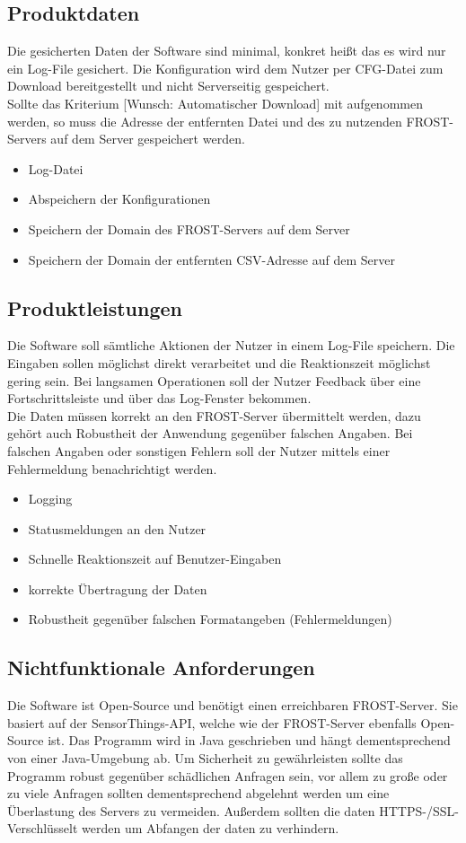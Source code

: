 \documentclass[12 pt]{article}
\begin{document}
\subsection{Produktdaten}
Die gesicherten Daten der Software sind minimal, konkret heißt das es wird nur ein Log-File gesichert. Die Konfiguration wird dem Nutzer per CFG-Datei zum Download bereitgestellt und nicht Serverseitig gespeichert.\\
Sollte das Kriterium [Wunsch: Automatischer Download] mit aufgenommen werden, so muss die Adresse der entfernten Datei und des zu nutzenden FROST-Servers auf dem Server gespeichert werden.
\begin{itemize}
\item Log-Datei
\item Abspeichern der Konfigurationen
\item Speichern der Domain des FROST-Servers auf dem Server
\item Speichern der Domain der entfernten CSV-Adresse auf dem Server
\end{itemize}

\subsection{Produktleistungen}
Die Software soll sämtliche Aktionen der Nutzer in einem Log-File speichern. Die Eingaben sollen möglichst direkt verarbeitet und die Reaktionszeit möglichst gering sein. Bei langsamen Operationen soll der Nutzer Feedback über eine Fortschrittsleiste und über das Log-Fenster bekommen. \\
Die Daten müssen korrekt an den FROST-Server übermittelt werden, dazu gehört auch Robustheit der Anwendung gegenüber falschen Angaben. Bei falschen Angaben oder sonstigen Fehlern soll der Nutzer mittels einer Fehlermeldung benachrichtigt werden.
\begin{itemize}
\item Logging
\item Statusmeldungen an den Nutzer
\item Schnelle Reaktionszeit auf Benutzer-Eingaben
\item korrekte Übertragung der Daten
\item Robustheit gegenüber falschen Formatangeben (Fehlermeldungen)
\end{itemize}

\subsection{Nichtfunktionale Anforderungen}
Die Software ist Open-Source und benötigt einen erreichbaren FROST-Server. Sie basiert auf der SensorThings-API, welche wie der FROST-Server ebenfalls Open-Source ist.
Das Programm wird in Java geschrieben und hängt dementsprechend von einer Java-Umgebung ab.
Um Sicherheit zu gewährleisten sollte das Programm robust gegenüber schädlichen Anfragen sein, vor allem zu große oder zu viele Anfragen sollten dementsprechend abgelehnt werden um eine Überlastung des Servers zu vermeiden.
Außerdem sollten die daten HTTPS-/SSL-Verschlüsselt werden um Abfangen der daten zu verhindern.
\end{document}
